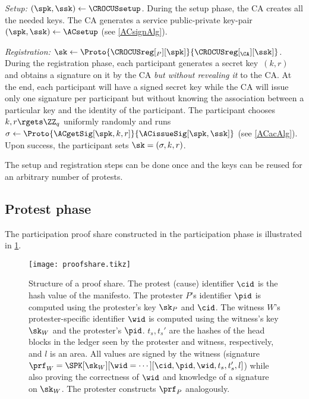 \emph{Setup: \((\spk, \ssk)\gets \CROCUSsetup\).}
During the setup phase, the \ac{CA} creates all the needed keys.
The \ac{CA} generates a service public-private key-pair \((\spk, \ssk)\gets 
  \ACsetup\) (see \cref{ACsignAlg}).

\emph{Registration: \(\sk\gets 
    \Proto{\CROCUSreg[_P][\spk]}{\CROCUSreg[_{\CA}][\ssk]}\).}
During the registration phase, each participant generates a secret key~\((k, 
  r)\) and obtains a signature on it by the \ac{CA} \emph{but without revealing 
  it} to the \ac{CA}.
At the end, each participant will have a signed secret key while the \ac{CA} 
will issue only one signature per participant but without knowing the 
association between a particular key and the identity of the participant.
The participant chooses \(k, r\rgets \ZZ_q\) uniformly randomly and runs 
\(\sigma \gets \Proto{\ACgetSig[\spk, k, r]}{\ACissueSig[\spk, \ssk]}\) (see 
\cref{ACacAlg}).
Upon success, the participant sets \(\sk = (\sigma, k, r)\).

The setup and registration steps can be done once and the keys can be reused 
for an arbitrary number of protests.

\subsection{Protest phase}%
\label{ProtocolDuring}



The participation proof share constructed in the
participation phase is illustrated in \cref{fig:ProofFig}.

\begin{figure}
  \centering
  \small
  \texttt{[image: proofshare.tikz]}
  \caption{%
    Structure of a proof share.
    The protest (cause) identifier \(\cid\) is the hash value of the manifesto.
    The protester \(P\)'s identifier \(\pid\) is computed using the protester's key \(\sk_P\) and \(\cid\).
    The witness \(W\)'s protester-specific identifier \(\wid\) is computed using the
    witness's key \(\sk_W\) and the protester's \(\pid\).
    \(t_s, t_s'\) are the hashes of the head blocks in the ledger seen by the 
    protester and witness, respectively, and \(l\) is an area.
    All values are signed by the witness (signature \(\prf_W = \SPK[\sk_W][\wid 
      = \dotsb][\cid, \pid, \wid, t_s, t_s', l]\)) while also proving the 
    correctness of \(\wid\) and knowledge of a signature on \(\sk_W\).
    The protester constructs \(\prf_P\) analogously.
  }%
  \label{fig:ProofFig}
\end{figure}%


